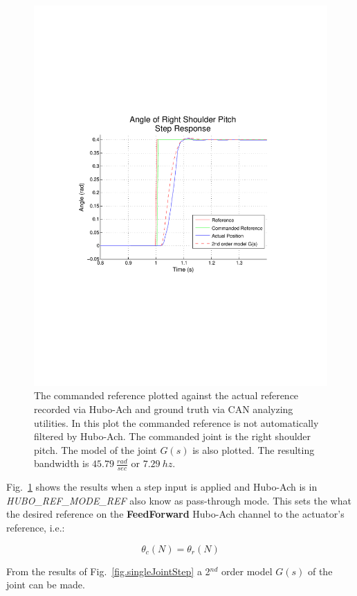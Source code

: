 \begin{figure}[thpb]
  \centering
\includegraphics[width=0.8\columnwidth]{./throwGraph/RSP-Zp4-step-step-real2.pdf}
  \caption{The commanded reference plotted against the actual reference recorded via Hubo-Ach and ground truth via CAN analyzing utilities.  In this plot the commanded reference is not automatically filtered by Hubo-Ach.  The commanded joint is the right shoulder pitch.  The model of the joint $G(s)$ is also plotted.  The resulting bandwidth is $45.79~\frac{rad}{sec}$ or $7.29~hz$.}
  \label{fig:singleJointStep}
\end{figure}






Fig.~\ref{fig:singleJointStep} shows the results when a step input is applied and Hubo-Ach is in \textit{HUBO\_REF\_MODE\_REF} also know as pass-through mode.
This sets the what the desired reference on the \textbf{FeedForward} Hubo-Ach channel to the actuator's reference, i.e.:

\begin{equation}\label{eq:refrefmode}
 \theta_c(N) = \theta_r(N)
\end{equation}

From the results of Fig.~\ref{fig.singleJointStep} a 2$^{nd}$ order model $G(s)$ of the joint can be made.

